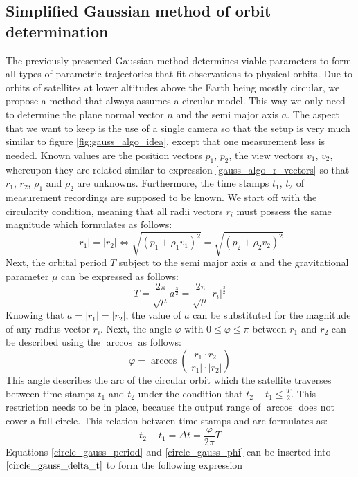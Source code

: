 \documentclass[11pt,a4paper]{article}
\begin{document}
	\subsection{Simplified Gaussian method of orbit determination}
	The previously presented Gaussian method determines viable parameters to form all types of parametric trajectories that fit observations to physical orbits. Due to orbits of satellites at lower altitudes above the Earth being mostly circular, we propose a method that always assumes a circular model. This way we only need to determine the plane normal vector $n$ and the semi major axis $a$. The aspect that we want to keep is the use of a single camera so that the setup is very much similar to figure \ref{fig:gauss_algo_idea}, except that one measurement less is needed. Known values are the position vectors $p_1$, $p_2$, the view vectors $v_1$, $v_2$, whereupon they are related similar to expression \ref{gauss_algo_r_vectors} so that $r_1$, $r_2$, $\rho_1$ and $\rho_2$ are unknowns. Furthermore, the time stamps $t_1$, $t_2$ of measurement recordings are supposed to be known.\newline
	We start off with the circularity condition, meaning that all radii vectors $r_i$ must possess the same magnitude which formulates as follows: 
	\begin{equation}
		\label{circle_gauss_circle_condition}
		\boxed{|r_1|=|r_2|\Leftrightarrow \sqrt{(p_1+\rho_1v_1)^2}=\sqrt{(p_2+\rho_2v_2)^2}}
	\end{equation}
	\noindent
	Next, the orbital period $T$ subject to the semi major axis $a$ and the gravitational parameter $\mu$ can be expressed as follows:
	\begin{equation}
		\label{circle_gauss_period}
		T=\frac{2\pi}{\sqrt{\mu}}a^{\frac{3}{2}}=\frac{2\pi}{\sqrt{\mu}}|r_i|^{\frac{3}{2}}
	\end{equation}
	\cite{elliptical_orbits}\newline
	Knowing that $a=|r_1|=|r_2|$, the value of $a$ can be substituted for the magnitude of any radius vector $r_i$. Next, the angle $\varphi$ with $0 \leq \varphi \leq \pi$ between $r_1$ and $r_2$ can be described using the $\arccos$ as follows:
	\begin{equation}
		\label{circle_gauss_phi}
		\varphi = \arccos\left(\frac{r_1\cdot r_2}{|r_1|\cdot|r_2|}\right)
	\end{equation}
	\noindent
	This angle describes the arc of the circular orbit which the satellite traverses between time stamps $t_1$ and $t_2$ under the condition that $t_2 - t_1 \leq \frac{T}{2}$. This restriction needs to be in place, because the output range of $\arccos$ does not cover a full circle. This relation between time stamps and arc formulates as:
	\begin{equation}
		\label{circle_gauss_delta_t}
		t_2 - t_1 = \Delta t=\frac{\varphi}{2\pi}T
	\end{equation}
	\noindent
	Equations \ref{circle_gauss_period} and \ref{circle_gauss_phi} can be inserted into $\ref{circle_gauss_delta_t}$ to form the following expression
	
\end{document}
